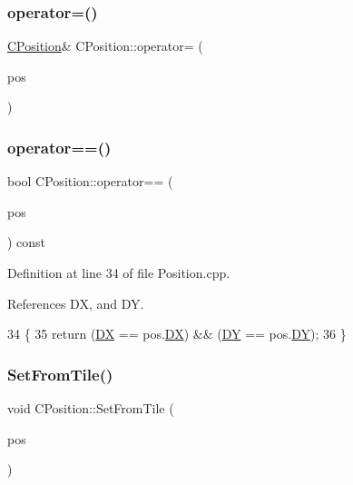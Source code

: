 \subsubsection{\texorpdfstring{operator=()}{operator=()}}
{\footnotesize\ttfamily \hyperlink{classCPosition}{C\+Position}\& C\+Position\+::operator= (\begin{DoxyParamCaption}\item[{const \hyperlink{classCPosition}{C\+Position} \&}]{pos }\end{DoxyParamCaption})\hspace{0.3cm}{\ttfamily [default]}}

\hypertarget{classCPosition_a301bf0382358092233b9cdd663677ee8}{}\label{classCPosition_a301bf0382358092233b9cdd663677ee8} 
\subsubsection{\texorpdfstring{operator==()}{operator==()}}
{\footnotesize\ttfamily bool C\+Position\+::operator== (\begin{DoxyParamCaption}\item[{const \hyperlink{classCPosition}{C\+Position} \&}]{pos }\end{DoxyParamCaption}) const}



Definition at line 34 of file Position.\+cpp.



References DX, and DY.


\begin{DoxyCode}
34                                                     \{
35     \textcolor{keywordflow}{return} (\hyperlink{classCPosition_a28445f9b872169715919074d82044eda}{DX} == pos.\hyperlink{classCPosition_a28445f9b872169715919074d82044eda}{DX}) && (\hyperlink{classCPosition_a84139c9e8eb547e7cf3cb851739943a4}{DY} == pos.\hyperlink{classCPosition_a84139c9e8eb547e7cf3cb851739943a4}{DY});
36 \}
\end{DoxyCode}
\hypertarget{classCPosition_a46994e6a8b8e3b4237edd7259ad844b6}{}\label{classCPosition_a46994e6a8b8e3b4237edd7259ad844b6} 
\subsubsection{\texorpdfstring{Set\+From\+Tile()}{SetFromTile()}}
{\footnotesize\ttfamily void C\+Position\+::\+Set\+From\+Tile (\begin{DoxyParamCaption}\item[{const \hyperlink{classCPosition}{C\+Position} \&}]{pos }\end{DoxyParamCaption})}




